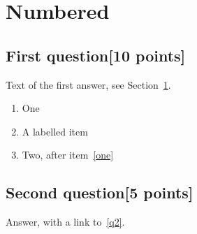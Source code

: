 \documentclass{article}
\newcommand{\question}[2]{\subsection*{#1\hfill[#2 points]}}
\begin{document}
\section{Numbered}\label{s}
\question{First question}{10}
Text of the first answer, see Section~\ref{s}.
\begin{enumerate}
\item One\label{one}
\item[(b)] A labelled item
\item Two, after item~\ref{one}
\end{enumerate}
\question{Second question}{5}\label{q2}
Answer, with a link to~\ref{q2}.
\end{document}
